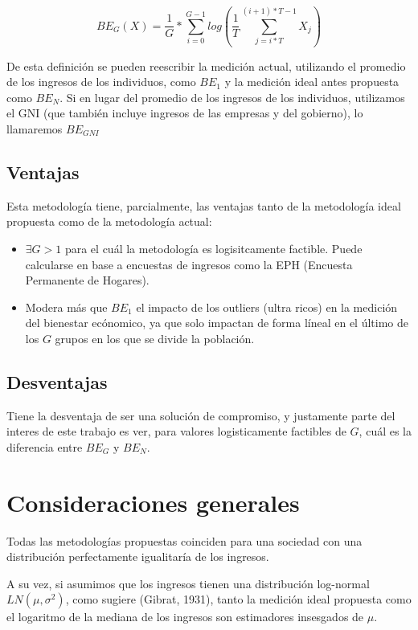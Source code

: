 $$
    BE_G(X) = \frac{1}{G} * \sum_{i=0}^{G-1}log(\frac{1}{T} \sum_{j=i*T}^{(i+1)*T-1}X_j)
$$

De esta definición se pueden reescribir la medición actual, utilizando el promedio de los ingresos de los individuos, como $BE_1$ y la medición ideal antes propuesta como $BE_N$. Si en lugar del promedio de los ingresos de los individuos, utilizamos el GNI (que también incluye ingresos de las empresas y del gobierno), lo llamaremos $BE_{GNI}$

\subsection{Ventajas}

Esta metodología tiene, parcialmente, las ventajas tanto de la metodología ideal propuesta como de la metodología actual:

\begin{itemize}
    \item $\exists G>1$ para el cuál la metodología es logisitcamente factible. Puede calcularse en base a encuestas de ingresos como la EPH (Encuesta Permanente de Hogares).
    \item Modera más que $BE_1$ el impacto de los outliers (ultra ricos) en la medición del bienestar ecónomico, ya que solo impactan de forma líneal en el último de los $G$ grupos en los que se divide la población.
\end{itemize}

\subsection{Desventajas}

Tiene la desventaja de ser una solución de compromiso, y justamente parte del interes de este trabajo es ver, para valores logisticamente factibles de $G$, cuál es la diferencia entre $BE_G$ y $BE_N$.

\section{Consideraciones generales}


Todas las metodologías propuestas coinciden para una sociedad con una distribución perfectamente igualitaría de los ingresos.

A su vez, si asumimos que los ingresos tienen una distribución log-normal $LN(\mu,\sigma^2)$, como sugiere (Gibrat, 1931)\cite{gibrat1931inégalités}, tanto la medición ideal propuesta como el logaritmo de la mediana de los ingresos son estimadores insesgados de $\mu$.